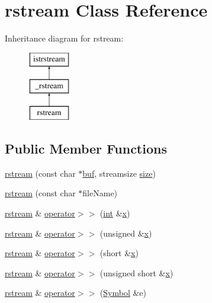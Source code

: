 \hypertarget{classrstream}{\section{rstream Class Reference}
\label{classrstream}
}
Inheritance diagram for rstream\-:\begin{figure}[H]
\begin{center}
\leavevmode
\includegraphics[height=3.000000cm]{classrstream}
\end{center}
\end{figure}
\subsection*{Public Member Functions}
\begin{DoxyCompactItemize}
\item 
\hyperlink{classrstream_a4b35677745769c8f0d9bd86b98bd141b}{rstream} (const char $\ast$\hyperlink{class__rstream_aecd5f92faba9be1c69d5c9ad2816fa89}{buf}, streamsize \hyperlink{ittnotify__static_8h_a5a1daa0c1d342747e3884fa54fc64fb1}{size})
\item 
\hyperlink{classrstream_a3f69f1c20d221bbdc529355d3c577371}{rstream} (const char $\ast$file\-Name)
\item 
\hyperlink{classrstream}{rstream} \& \hyperlink{classrstream_ad873c9748f8fffd60ef780bfc193762c}{operator$>$$>$} (\hyperlink{ittnotify__static_8h_a8b8dcd723308a8cb5d84277c7a3fff70}{int} \&\hyperlink{ittnotify__static_8h_a25eb27b280775b27a5ddc4d1673225aa}{x})
\item 
\hyperlink{classrstream}{rstream} \& \hyperlink{classrstream_a6943a853664c8523e93fb217655b71f4}{operator$>$$>$} (unsigned \&\hyperlink{ittnotify__static_8h_a25eb27b280775b27a5ddc4d1673225aa}{x})
\item 
\hyperlink{classrstream}{rstream} \& \hyperlink{classrstream_a8eb5507f7f7a649637d8aa317d400378}{operator$>$$>$} (short \&\hyperlink{ittnotify__static_8h_a25eb27b280775b27a5ddc4d1673225aa}{x})
\item 
\hyperlink{classrstream}{rstream} \& \hyperlink{classrstream_a0db7605f858c0082e4ba38d7fb59cfcf}{operator$>$$>$} (unsigned short \&\hyperlink{ittnotify__static_8h_a25eb27b280775b27a5ddc4d1673225aa}{x})
\item 
\hyperlink{classrstream}{rstream} \& \hyperlink{classrstream_ae0552d85bad3c2463f1a59d8c416812b}{operator$>$$>$} (\hyperlink{classSymbol}{Symbol} \&e)
\end{DoxyCompactItemize}
